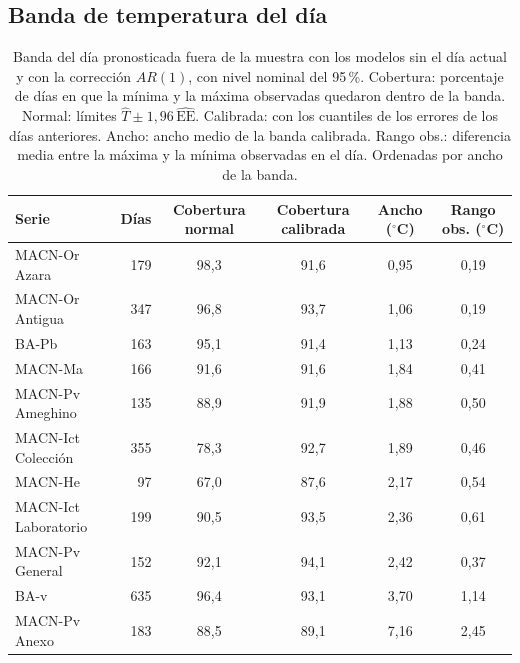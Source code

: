 \documentclass[11pt,a4paper]{article}
\begin{document}
\subsection{Banda de temperatura del día}
\label{anexo:banda}
\begin{table}[H]
\centering
\footnotesize
\setlength{\tabcolsep}{4pt}
\caption{Banda del día pronosticada fuera de la muestra con los modelos sin el día actual y con la corrección $AR(1)$, con nivel nominal del 95\,\%. Cobertura: porcentaje de días en que la mínima y la máxima observadas quedaron dentro de la banda. Normal: límites $\hat T \pm 1{,}96\,\widehat{\mathrm{EE}}$. Calibrada: con los cuantiles de los errores de los días anteriores. Ancho: ancho medio de la banda calibrada. Rango obs.: diferencia media entre la máxima y la mínima observadas en el día. Ordenadas por ancho de la banda.}
\label{tab:banda}
\begin{tabular}{l r c c c c}
\toprule
\textbf{Serie} & \textbf{Días} & \textbf{Cobertura normal} & \textbf{Cobertura calibrada} & \textbf{Ancho ($^\circ$C)} & \textbf{Rango obs. ($^\circ$C)} \\
\midrule
MACN-Or Azara        & 179 & 98{,}3 & 91{,}6 & 0{,}95 & 0{,}19 \\
MACN-Or Antigua      & 347 & 96{,}8 & 93{,}7 & 1{,}06 & 0{,}19 \\
BA-Pb                & 163 & 95{,}1 & 91{,}4 & 1{,}13 & 0{,}24 \\
MACN-Ma              & 166 & 91{,}6 & 91{,}6 & 1{,}84 & 0{,}41 \\
MACN-Pv Ameghino     & 135 & 88{,}9 & 91{,}9 & 1{,}88 & 0{,}50 \\
MACN-Ict Colección   & 355 & 78{,}3 & 92{,}7 & 1{,}89 & 0{,}46 \\
MACN-He              &  97 & 67{,}0 & 87{,}6 & 2{,}17 & 0{,}54 \\
MACN-Ict Laboratorio & 199 & 90{,}5 & 93{,}5 & 2{,}36 & 0{,}61 \\
MACN-Pv General      & 152 & 92{,}1 & 94{,}1 & 2{,}42 & 0{,}37 \\
BA-v                 & 635 & 96{,}4 & 93{,}1 & 3{,}70 & 1{,}14 \\
MACN-Pv Anexo        & 183 & 88{,}5 & 89{,}1 & 7{,}16 & 2{,}45 \\
\bottomrule
\end{tabular}
\end{table}
\end{document}
